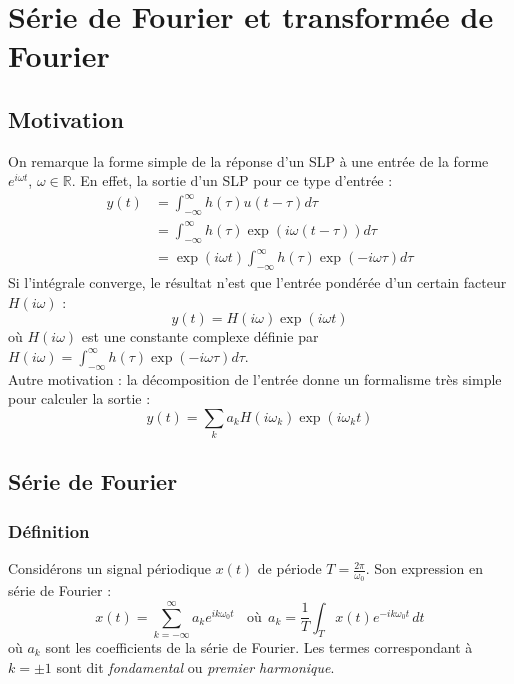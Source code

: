 \chapter{Série de Fourier et transformée de Fourier}

\section{Motivation}
On remarque la forme simple de la réponse d'un SLP à  une entrée de
la forme $e^{i\omega t}$, $\omega\in\mathbb{R}$. En effet, la sortie d'un SLP pour ce type
d'entrée :
\begin{equation}
\begin{array}{ll}
y(t) &= \int_{-\infty}^\infty h(\tau)u(t-\tau)d\tau\\
 &= \int_{-\infty}^\infty h(\tau)\exp(i\omega(t-\tau))d\tau\\
 &= \exp(i\omega t)\int_{-\infty}^\infty h(\tau)\exp(-i\omega\tau)
 d\tau
\end{array}
\end{equation}
Si l'intégrale converge, le résultat n'est que l'entrée pondérée 
d'un certain facteur $H(i\omega)$ :
\begin{equation}
y(t) = H(i\omega)\exp(i\omega t)
\end{equation}
où $H(i\omega)$ est une constante complexe définie par $H(i\omega) =
\int_{-\infty}^\infty h(\tau)\exp(-i\omega\tau)d\tau$.\\
Autre motivation : la décomposition de l'entrée donne un formalisme
très simple pour calculer la sortie :
\begin{equation}
y(t) = \sum_k a_kH(i\omega_k)\exp(i\omega_kt)
\end{equation}

\section{Série de Fourier}
	\subsection{Définition}
	Considérons un signal périodique $x(t)$ de période $T=\frac{2\pi}
	{\omega_0}$. Son expression en série de Fourier :
	\begin{equation}
	x(t) = \sum_{k=-\infty}^\infty a_ke^{ik\omega_0t}\ \ \ \ \text{où}\ \ 
	a_k = \frac{1}{T}\int_Tx(t)e^{-ik\omega_0t}\, dt
	\end{equation}
	où $a_k$ sont les coefficients de la série de Fourier. Les termes
	correspondant à $k=\pm 1$ sont dit \textit{fondamental} ou \textit{
	premier harmonique}.\ \\
	
